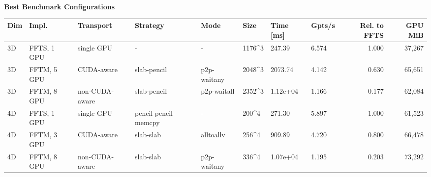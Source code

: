 \documentclass{article}
\begin{document}
\begin{center}
{\fontsize{8.0pt}{9.4pt}\selectfont
\textbf{Best Benchmark Configurations}

\vspace{0.6em}
\begin{tabular}{llllllllrr}
\hline
Dim & Impl. & Transport & Strategy & Mode & Size & Time [ms] & Gpts/s & Rel. to FFTS & GPU MiB \\
\hline
3D & FFTS, 1 GPU & single GPU & - & - & 1176\textasciicircum{}3 & 247.39 & 6.574 & 1.000 & 37,267 \\
3D & FFTM, 5 GPU & CUDA-aware & slab-pencil & p2p-waitany & 2048\textasciicircum{}3 & 2073.74 & 4.142 & 0.630 & 65,651 \\
3D & FFTM, 8 GPU & non-CUDA-aware & slab-pencil & p2p-waitall & 2352\textasciicircum{}3 & 1.12e+04 & 1.166 & 0.177 & 62,084 \\
4D & FFTS, 1 GPU & single GPU & pencil-pencil-memcpy & - & 200\textasciicircum{}4 & 271.30 & 5.897 & 1.000 & 61,523 \\
4D & FFTM, 3 GPU & CUDA-aware & slab-slab & alltoallv & 256\textasciicircum{}4 & 909.89 & 4.720 & 0.800 & 66,478 \\
4D & FFTM, 8 GPU & non-CUDA-aware & slab-slab & p2p-waitany & 336\textasciicircum{}4 & 1.07e+04 & 1.195 & 0.203 & 73,292 \\
\hline
\end{tabular}
}
\end{center}
\end{document}
